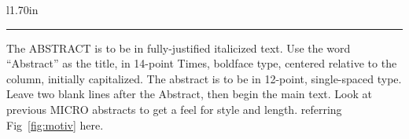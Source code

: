 \begin{wrapfigure}{l}{1.70in}
\centering
 \hrule
 \caption{\label{fig:motiv} \scriptsize \bf Caption.}
\end{wrapfigure}

The ABSTRACT is to be in fully-justified italicized text. Use the word ``Abstract'' as the title, in
14-point Times, boldface type, centered relative to the column, initially capitalized. The abstract
is to be in 12-point, single-spaced type. Leave two blank lines after the Abstract, then begin the
main text. Look at previous MICRO abstracts to get a feel for style and length. referring
Fig~\ref{fig:motiv} here.

